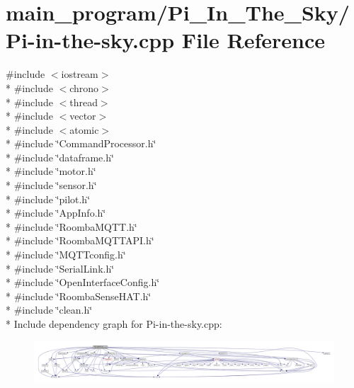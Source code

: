 \hypertarget{_pi-in-the-sky_8cpp}{}\section{main\+\_\+program/\+Pi\+\_\+\+In\+\_\+\+The\+\_\+\+Sky/\+Pi-\/in-\/the-\/sky.cpp File Reference}
\label{_pi-in-the-sky_8cpp}
{\ttfamily \#include $<$iostream$>$}\\*
{\ttfamily \#include $<$chrono$>$}\\*
{\ttfamily \#include $<$thread$>$}\\*
{\ttfamily \#include $<$vector$>$}\\*
{\ttfamily \#include $<$atomic$>$}\\*
{\ttfamily \#include \char`\"{}Command\+Processor.\+h\char`\"{}}\\*
{\ttfamily \#include \char`\"{}dataframe.\+h\char`\"{}}\\*
{\ttfamily \#include \char`\"{}motor.\+h\char`\"{}}\\*
{\ttfamily \#include \char`\"{}sensor.\+h\char`\"{}}\\*
{\ttfamily \#include \char`\"{}pilot.\+h\char`\"{}}\\*
{\ttfamily \#include \char`\"{}App\+Info.\+h\char`\"{}}\\*
{\ttfamily \#include \char`\"{}Roomba\+M\+Q\+T\+T.\+h\char`\"{}}\\*
{\ttfamily \#include \char`\"{}Roomba\+M\+Q\+T\+T\+A\+P\+I.\+h\char`\"{}}\\*
{\ttfamily \#include \char`\"{}M\+Q\+T\+Tconfig.\+h\char`\"{}}\\*
{\ttfamily \#include \char`\"{}Serial\+Link.\+h\char`\"{}}\\*
{\ttfamily \#include \char`\"{}Open\+Interface\+Config.\+h\char`\"{}}\\*
{\ttfamily \#include \char`\"{}Roomba\+Sense\+H\+A\+T.\+h\char`\"{}}\\*
{\ttfamily \#include \char`\"{}clean.\+h\char`\"{}}\\*
Include dependency graph for Pi-\/in-\/the-\/sky.cpp\+:\nopagebreak
\begin{figure}[H]
\begin{center}
\leavevmode
\includegraphics[width=350pt]{_pi-in-the-sky_8cpp__incl}
\end{center}
\end{figure}
